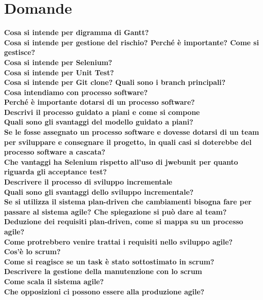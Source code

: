 \section{Domande}
\label{sec:domande}
\textbf{Cosa si intende per digramma di Gantt?}\\

\textbf{Cosa si intende per gestione del rischio? Perché è importante? Come si gestisce?}\\
\textbf{Cosa si intende per Selenium?}\\
\textbf{Cosa si intende per Unit Test?}\\
\textbf{Cosa si intende per Git clone? Quali sono i branch principali?}\\
\textbf{Cosa intendiamo con processo software?}\\
\textbf{Perché è importante dotarsi di un processo software?}\\
\textbf{Descrivi il processo guidato a piani e come si compone}\\
\textbf{Quali sono gli svantaggi del modello guidato a piani?}\\
\textbf{Se le fosse assegnato un processo software e dovesse dotarsi di un team per sviluppare e consegnare il progetto, in quali casi si doterebbe del processo software a cascata?}\\
\textbf{Che vantaggi ha Selenium rispetto all'uso di jwebunit per quanto riguarda gli acceptance test?}\\
\textbf{Descrivere il processo di sviluppo incrementale}\\
\textbf{Quali sono gli svantaggi dello sviluppo incrementale?}\\
\textbf{Se si utilizza il sistema plan-driven che cambiamenti bisogna fare per passare al sistema agile? Che spiegazione si può dare al team?}\\
\textbf{Deduzione dei requisiti plan-driven, come si mappa su un processo agile?}\\
\textbf{Come protrebbero venire trattai i requisiti nello sviluppo agile?}\\
\textbf{Cos'è lo scrum?}\\
\textbf{Come si reagisce se un task è stato sottostimato in scrum?}\\
\textbf{Descrivere la gestione della manutenzione con lo scrum}\\
\textbf{Come scala il sistema agile?}\\
\textbf{Che opposizioni ci possono essere alla produzione agile?}\\
